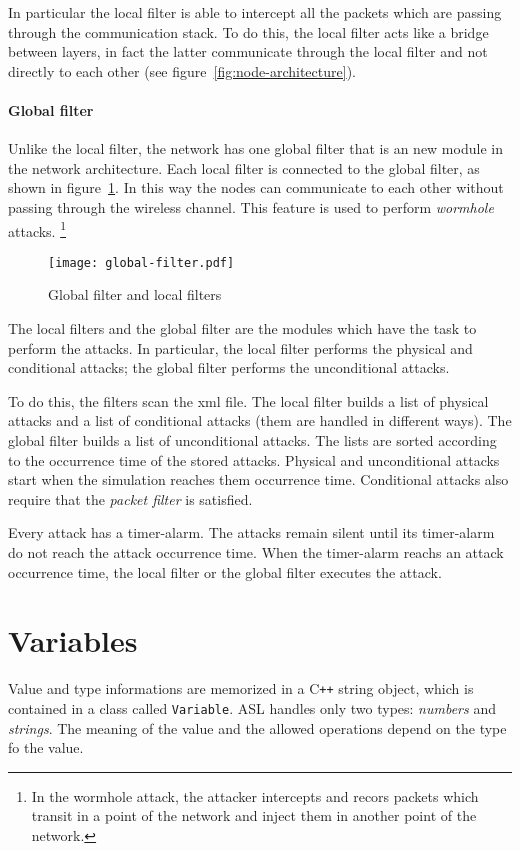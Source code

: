 In particular the local filter is able to intercept all the packets which are passing through the communication stack. To do this, the local filter acts like a bridge  between layers, in fact the latter communicate through the local filter and not directly to each other (see figure~\ref{fig:node-architecture}).

\paragraph{Global filter}
Unlike the local filter, the network has one global filter that is an new module in the network architecture. Each local filter is connected to the global filter, as shown in figure~\ref{fig:local-global}. In this way the nodes can communicate to each other without passing through the wireless channel. This feature is used to perform \emph{wormhole} attacks. \footnote{In the wormhole attack, the attacker intercepts and recors packets which transit in a point of the network and inject them in another point of the network.}
\begin{figure}
\centering
\texttt{[image: global-filter.pdf]}
\caption{Global filter and local filters}
\label{fig:local-global}
\end{figure} 

The local filters and the global filter are the modules which have the task to perform the attacks. In particular, the local filter performs the physical and conditional attacks; the global filter performs the unconditional attacks.

To do this, the filters scan the xml file. The local filter builds a list of physical attacks and a list of conditional attacks (them are handled in different ways). The global filter builds a list of unconditional attacks. The lists are sorted according to the occurrence time of the stored attacks. Physical and unconditional attacks start when the simulation reaches them occurrence time.  Conditional attacks also require that the \emph{packet filter} is satisfied.

Every attack has a timer-alarm. The attacks remain silent until its timer-alarm do not reach the attack occurrence time. When the timer-alarm reachs an attack occurrence time, the local filter or the global filter executes the attack.



\section{Variables}
Value and type informations are memorized in a C\texttt{++} string object, which is contained in a class called \texttt{Variable}. ASL handles only two types: \emph{numbers} and \emph{strings}. The meaning of the value and the allowed operations depend on the type fo the value. 

